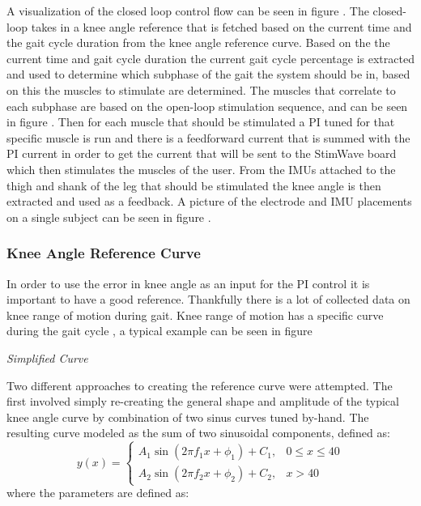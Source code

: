 A visualization of the closed loop control flow can be seen in figure . The closed-loop takes in a knee angle reference that is fetched based on the current time and the gait cycle duration from the knee angle reference curve. Based on the the current time and gait cycle duration the current gait cycle percentage is extracted and used to determine which subphase of the gait the system should be in, based on this the muscles to stimulate are determined. The muscles that correlate to each subphase are based on the open-loop stimulation sequence, and can be seen in figure . Then for each muscle that should be stimulated a PI tuned for that specific muscle is run and there is a feedforward current that is summed with the PI current in order to get the current that will be sent to the StimWave board which then stimulates the muscles of the user. From the IMUs attached to the thigh and shank of the leg that should be stimulated the knee angle is then extracted and used as a feedback. A picture of the electrode and IMU placements on a single subject can be seen in figure .



\subsubsection{Knee Angle Reference Curve}
In order to use the error in knee angle as an input for the PI control it is important to have a good reference. Thankfully there is a lot of collected data on knee range of motion during gait. Knee range of motion has a specific curve during the gait cycle , a typical example can be seen in figure  
\newline 

\textit{Simplified Curve}

Two different approaches to creating the reference curve were attempted. The first involved simply re-creating the general shape and amplitude of the typical knee angle curve by combination of two sinus curves tuned by-hand. The resulting curve modeled as the sum of two sinusoidal components, defined as:
\[
y(x) =
\begin{cases}
A_1 \sin\left(2 \pi f_1 x + \phi_1\right) + C_1, & 0 \leq x \leq 40 \\
A_2 \sin\left(2 \pi f_2 x + \phi_2\right) + C_2, & x > 40
\end{cases}
\]
where the parameters are defined as:

